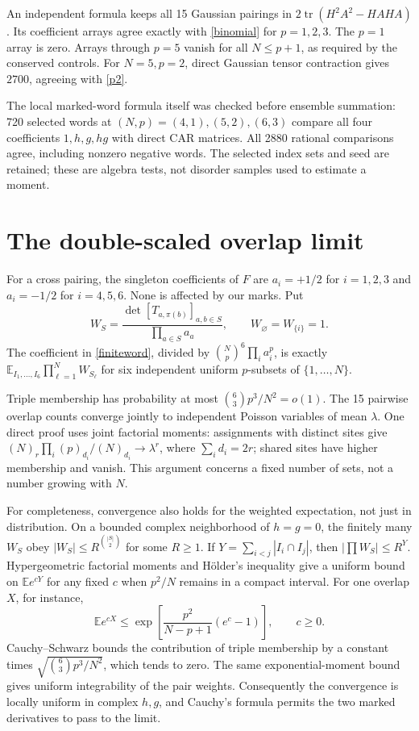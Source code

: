 \documentclass[11pt,a4paper]{article}
\newcommand{\tr}{\operatorname{tr}}
\newcommand{\E}{\mathbb E}
\begin{document}
An independent formula keeps all 15 Gaussian pairings in
$2\tr(H^2A^2-HAHA)$. Its coefficient arrays agree exactly with
\eqref{binomial} for $p=1,2,3$. The $p=1$ array is zero. Arrays through
$p=5$ vanish for all $N\le p+1$, as required by the conserved controls.
For $N=5,p=2$, direct Gaussian tensor contraction gives $2700$, agreeing
with \eqref{p2}.

The local marked-word formula itself was checked before ensemble
summation: 720 selected words at $(N,p)=(4,1),(5,2),(6,3)$ compare all
four coefficients $1,h,g,hg$ with direct CAR matrices. All 2880 rational
comparisons agree, including nonzero negative words. The selected index
sets and seed are retained; these are algebra tests, not disorder samples
used to estimate a moment.

\section{The double-scaled overlap limit}
For a cross pairing, the singleton coefficients of $F$ are
$a_i=+1/2$ for $i=1,2,3$ and $a_i=-1/2$ for $i=4,5,6$.
None is affected by our marks. Put
\begin{equation}
 W_S=\frac{\det[T_{a,\pi(b)}]_{a,b\in S}}{\prod_{a\in S}a_a},
 \qquad W_\varnothing=W_{\{i\}}=1.
\end{equation}
The coefficient in \eqref{finiteword}, divided by
$\binom Np^6\prod_i a_i^p$, is exactly
$\E_{I_1,\ldots,I_6}\prod_{\ell=1}^N W_{S_\ell}$ for six independent
uniform $p$-subsets of $\{1,\ldots,N\}$.

\newpage
Triple membership has probability at most
$\binom63p^3/N^2=o(1)$. The 15 pairwise overlap counts converge jointly
to independent Poisson variables of mean $\lambda$. One direct proof
uses joint factorial moments: assignments with distinct sites give
$(N)_r\prod_i(p)_{d_i}/(N)_{d_i}\to\lambda^r$, where
$\sum_i d_i=2r$; shared sites have higher membership and vanish.
This argument concerns a fixed number of sets, not a number growing
with $N$.

For completeness, convergence also holds for the weighted expectation,
not just in distribution. On a bounded complex neighborhood of $h=g=0$,
the finitely many $W_S$ obey $|W_S|\le R^{\binom{|S|}{2}}$ for some
$R\ge1$. If $Y=\sum_{i<j}|I_i\cap I_j|$, then
$|\prod W_S|\le R^Y$. Hypergeometric factorial moments and H\"older's
inequality give a uniform bound on $\E e^{cY}$ for any fixed $c$ when
$p^2/N$ remains in a compact interval. For one overlap $X$, for instance,
\begin{equation}
 \E e^{cX}\le
 \exp\!\left[\frac{p^2}{N-p+1}(e^c-1)\right],\qquad c\ge0.
\end{equation}
Cauchy--Schwarz bounds the contribution of triple membership by a
constant times $\sqrt{\binom63p^3/N^2}$, which tends to zero. The same
exponential-moment bound gives uniform integrability of the pair weights.
Consequently the convergence is locally uniform in complex $h,g$, and
Cauchy's formula permits the two marked derivatives to pass to the limit.
\end{document}
